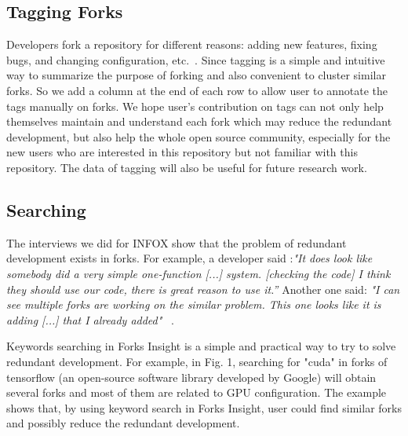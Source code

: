 \subsection{Tagging Forks}
%
Developers fork a repository for different reasons: adding new features, fixing bugs, and changing configuration, etc.~\cite{Mikkonen2011,Robles2012,dubinsky2013exploratory,stanciulescu2015forked}.
%
Since tagging is a simple and intuitive way to summarize the purpose of forking and also convenient to cluster similar forks. So we add a column at the end of each row to allow user to annotate the tags manually on forks. We hope user's contribution on tags can not only help themselves maintain and understand each fork which may reduce the redundant development, but also help the whole open source community, especially for the new users who are interested in this repository but not familiar with this repository. The data of tagging will also be useful for future research work.


\subsection{Searching}

The interviews we did for INFOX show that the problem of redundant development exists in forks. For example, a developer said :\emph{"It does look like somebody did a very simple one-function [...] system. [checking the code] I think they should use our code, there is great reason to use it.''} Another one said: \emph{"I can see multiple forks are working on the similar problem. This one looks like it is adding [...] that I already added"} ~\cite{ZSLXWK:ICSE18}.

Keywords searching in Forks Insight is a simple and practical way to try to solve redundant development. For example, in Fig. 1, searching for "cuda" in forks of tensorflow (an open-source software library developed by Google) will obtain several forks and most of them are related to GPU configuration. The example shows that, by using keyword search in Forks Insight, user could find similar forks and possibly reduce the redundant development.

\iffalse
\begin{figure}[H]
\centering
\texttt{[image: shot2.png]}
\caption{An example of searching for similar forks.}
\vspace{-10pt}
\end{figure}
\fi

